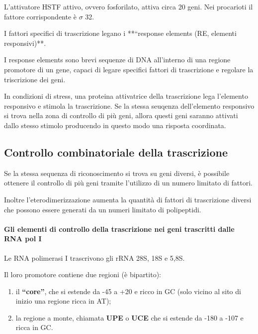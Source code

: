 \documentclass[11pt]{book}
\begin{document}
L'attivatore HSTF attivo, ovvero fosforilato, attiva circa 20 geni. Nei
procarioti il fattore corrispondente è \(\sigma\) 32.

I fattori specifici di trascrizione legano i **``response elements (RE,
elementi responsivi)**.

I response elements sono brevi sequenze di DNA all'interno di una
regione promotore di un gene, capaci di legare specifici fattori di
trascrizione e regolare la triscrizione dei geni.

In condizioni di stress, una proteina attivatrice della trascrizione
lega l'elemento responsivo e stimola la trascrizione. Se la stessa
seuqenza dell'elemento responsivo si trova nella zona di controllo di
più geni, allora questi geni saranno attivati dallo stesso stimolo
producendo in questo modo una risposta coordinata.

\subsection{Controllo combinatoriale della
trascrizione}\label{controllo-combinatoriale-della-trascrizione}

Se la stessa sequenza di riconoscimento si trova su geni diversi, è
possibile ottenere il controllo di più geni tramite l'utilizzo di un
numero limitato di fattori.

Inoltre l'eterodimerizzazione aumenta la quantità di fattori di
trascrizione diversi che possono essere generati da un numeri limitato
di polipeptidi.

\paragraph{Gli elementi di controllo della trascrizione nei geni
trascritti dalle RNA pol
I}\label{gli-elementi-di-controllo-della-trascrizione-nei-geni-trascritti-dalle-rna-pol-i}

Le RNA polimerasi I trascrivono gli rRNA 28S, 18S e 5,8S.

Il loro promotore contiene due regioni (è bipartito):

\begin{enumerate}
\def\labelenumi{\arabic{enumi}.}
\itemsep1pt\parskip0pt
\item
  il \textbf{``core''}, che si estende da -45 a +20 e ricco in GC (solo
  vicino al sito di inizio una regione ricca in AT);
\item
  la regione a monte, chiamata \textbf{UPE} o \textbf{UCE} che si
  estende da -180 a -107 e ricca in GC.
\end{enumerate}
\end{document}
